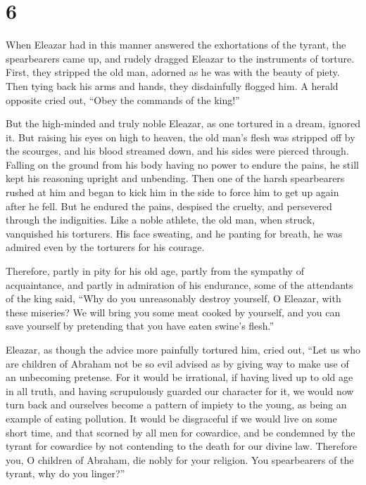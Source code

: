 \hypertarget{section-5}{%
\section{6}\label{section-5}}

 When Eleazar had in this manner answered the exhortations
of the tyrant, the spearbearers came up, and rudely dragged Eleazar to
the instruments of torture.  First, they stripped the old
man, adorned as he was with the beauty of piety.  Then
tying back his arms and hands, they disdainfully flogged him.
 A herald opposite cried out, ``Obey the commands of the
king!''

 But the high-minded and truly noble Eleazar, as one
tortured in a dream, ignored it.  But raising his eyes on
high to heaven, the old man's flesh was stripped off by the scourges,
and his blood streamed down, and his sides were pierced through.
 Falling on the ground from his body having no power to
endure the pains, he still kept his reasoning upright and unbending.
 Then one of the harsh spearbearers rushed at him and
began to kick him in the side to force him to get up again after he
fell.  But he endured the pains, despised the cruelty, and
persevered through the indignities.  Like a noble
athlete, the old man, when struck, vanquished his torturers.
 His face sweating, and he panting for breath, he was
admired even by the torturers for his courage.

 Therefore, partly in pity for his old age,
 partly from the sympathy of acquaintance, and partly in
admiration of his endurance, some of the attendants of the king said,
 ``Why do you unreasonably destroy yourself, O Eleazar,
with these miseries?  We will bring you some meat cooked
by yourself, and you can save yourself by pretending that you have eaten
swine's flesh.''

 Eleazar, as though the advice more painfully tortured
him, cried out,  ``Let us who are children of Abraham not
be so evil advised as by giving way to make use of an unbecoming
pretense.  For it would be irrational, if having lived up
to old age in all truth, and having scrupulously guarded our character
for it, we would now turn back  and ourselves become a
pattern of impiety to the young, as being an example of eating
pollution.  It would be disgraceful if we would live on
some short time, and that scorned by all men for cowardice,
 and be condemned by the tyrant for cowardice by not
contending to the death for our divine law.  Therefore
you, O children of Abraham, die nobly for your religion. 
You spearbearers of the tyrant, why do you linger?''

